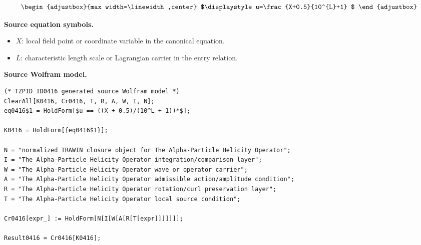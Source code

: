 \[
\begin{adjustbox}{max width=\linewidth,center}
$\displaystyle
u=\frac{X+0.5}{10^{L}+1}
$
\end{adjustbox}
\]

\begin{minipage}[t]{0.49\linewidth}
\begingroup
\small
\raggedright
\textbf{Source equation symbols.}\par
\begin{itemize}[leftmargin=1.35em,itemsep=1pt,topsep=1pt,parsep=0pt]
    \item $X$: local field point or coordinate variable in the canonical equation.
    \item $L$: characteristic length scale or Lagrangian carrier in the entry relation.
\end{itemize}
\endgroup
\end{minipage}\hfill
\begin{minipage}[t]{0.47\linewidth}
\begingroup
\scriptsize
\raggedright
\textbf{Source Wolfram model.}\par
\begin{Verbatim}[fontsize=\tiny,breaklines=true,breakanywhere=true]
(* TZPID ID0416 generated source Wolfram model *)
ClearAll[K0416, Cr0416, T, R, A, W, I, N];
eq0416$1 = HoldForm[$u == ((X + 0.5)/(10^L + 1))*$];

K0416 = HoldForm[{eq0416$1}];

N = "normalized TRAWIN closure object for The Alpha-Particle Helicity Operator";
I = "The Alpha-Particle Helicity Operator integration/comparison layer";
W = "The Alpha-Particle Helicity Operator wave or operator carrier";
A = "The Alpha-Particle Helicity Operator admissible action/amplitude condition";
R = "The Alpha-Particle Helicity Operator rotation/curl preservation layer";
T = "The Alpha-Particle Helicity Operator local source condition";

Cr0416[expr_] := HoldForm[N[I[W[A[R[T[expr]]]]]]];

Result0416 = Cr0416[K0416];
\end{Verbatim}
\endgroup
\end{minipage}

